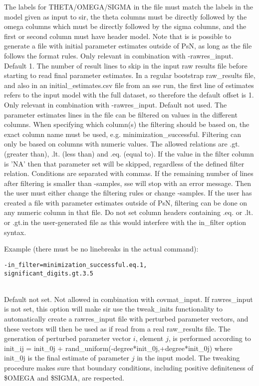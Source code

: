 \begin{optionlist}
The labels for  THETA/OMEGA/SIGMA 
in the file must match the labels in the model given as input 
to sir, the theta columns must be directly followed by the omega columns 
which must be directly followed by the sigma columns, and the first or
second column must have header model. Note that is is 
possible to generate a file with initial parameter estimates outside 
of PsN, as long as the file follows the format rules.
\nextopt
{}
Only relevant in combination with -rawres\_input. Default 1. The number of result lines to skip in the input raw results file before starting to read final parameter estimates. In a regular bootstrap raw\_results file, and also in an initial\_estimates.csv file from an sse run, 
the first line of estimates refers to the input model with the full dataset, so therefore the default offset is 1. 
\nextopt
{}
Only relevant in combination with -rawres\_input. Default not used. The parameter estimates lines in the file can be filtered on values in the different columns. When specifying which column(s) the filtering should be based on, the exact column name must be used, e.g. minimization\_successful. Filtering can only be based on columns with numeric values. The allowed relations are .gt. (greater than), .lt. (less than) and .eq. (equal to). If the value in the filter column is 'NA' then that parameter set will be skipped, regardless of the defined filter relation. Conditions are separated with commas. If the remaining number of lines after filtering is smaller than -samples, sse will stop with an error message. Then the user must either change the filtering rules or change -samples. If the user has created a file with parameter estimates outside of PsN, filtering can be done on any numeric column in that file. Do not set column headers containing .eq. or .lt. or .gt.in the user-generated file as this would interfere with the in\_filter option syntax.

Example (there must be no linebreaks in the actual command):
\begin{verbatim}
-in_filter=minimization_successful.eq.1,
significant_digits.gt.3.5
\end{verbatim} \\
\nextopt
{}
Default not set. Not allowed in combination with covmat\_input. If rawres\_input is not set,
this option will make sir use the tweak\_inits functionality to automatically create a 
rawres\_input file with perturbed parameter vectors, and these vectors will then be used
as if read from a real raw\_results file. 
The generation of perturbed parameter vector $i$, element $j$, is performed according to 
init\_ij = init\_0j + rand\_uniform(-degree*init\_0j,+degree*init\_0j)
where init\_0j is the final estimate of 
parameter $j$ in the input model. 
The tweaking procedure makes sure that boundary conditions, including positive definiteness of 
\$OMEGA and \$SIGMA, are respected.


\end{optionlist}
